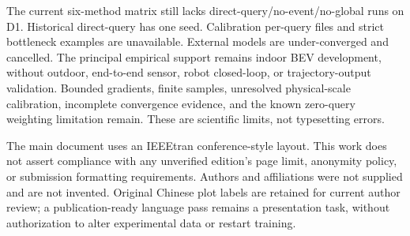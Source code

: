 \documentclass[conference,letterpaper,10pt,onecolumn]{IEEEtran}
\begin{document}
The current six-method matrix still lacks direct-query/no-event/no-global runs on D1. Historical direct-query has one seed. Calibration per-query files and strict bottleneck examples are unavailable. External models are under-converged and cancelled. The principal empirical support remains indoor BEV development, without outdoor, end-to-end sensor, robot closed-loop, or trajectory-output validation. Bounded gradients, finite samples, unresolved physical-scale calibration, incomplete convergence evidence, and the known zero-query weighting limitation remain. These are scientific limits, not typesetting errors.

The main document uses an IEEEtran conference-style layout. This work does not assert compliance with any unverified edition's page limit, anonymity policy, or submission formatting requirements. Authors and affiliations were not supplied and are not invented. Original Chinese plot labels are retained for current author review; a publication-ready language pass remains a presentation task, without authorization to alter experimental data or restart training.



\end{document}
